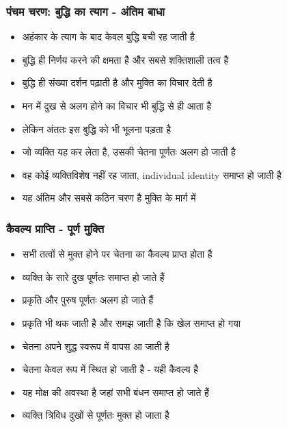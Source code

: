 \begin{frame}[fragile]\frametitle{पंचम चरण: बुद्धि का त्याग - अंतिम बाधा}
      \begin{itemize}
          \item अहंकार के त्याग के बाद केवल बुद्धि बची रह जाती है
          \item बुद्धि ही निर्णय करने की क्षमता है और सबसे शक्तिशाली तत्व है
          \item बुद्धि ही संख्या दर्शन पढ़ाती है और मुक्ति का विचार देती है
          \item मन में दुख से अलग होने का विचार भी बुद्धि से ही आता है
          \item लेकिन अंततः इस बुद्धि को भी भूलना पड़ता है
          \item जो व्यक्ति यह कर लेता है, उसकी चेतना पूर्णतः अलग हो जाती है
          \item वह कोई व्यक्तिविशेष नहीं रह जाता, individual identity समाप्त हो जाती है
          \item यह अंतिम और सबसे कठिन चरण है मुक्ति के मार्ग में
      \end{itemize}
\end{frame}

\begin{frame}[fragile]\frametitle{कैवल्य प्राप्ति - पूर्ण मुक्ति}
      \begin{itemize}
          \item सभी तत्वों से मुक्त होने पर चेतना का कैवल्य प्राप्त होता है
          \item व्यक्ति के सारे दुख पूर्णतः समाप्त हो जाते हैं
          \item प्रकृति और पुरुष पूर्णतः अलग हो जाते हैं
          \item प्रकृति भी थक जाती है और समझ जाती है कि खेल समाप्त हो गया
          \item चेतना अपने शुद्ध स्वरूप में वापस आ जाती है
          \item चेतना केवल रूप में स्थित हो जाती है - यही कैवल्य है
          \item यह मोक्ष की अवस्था है जहां सभी बंधन समाप्त हो जाते हैं
          \item व्यक्ति त्रिविध दुखों से पूर्णतः मुक्त हो जाता है
      \end{itemize}
\end{frame}

